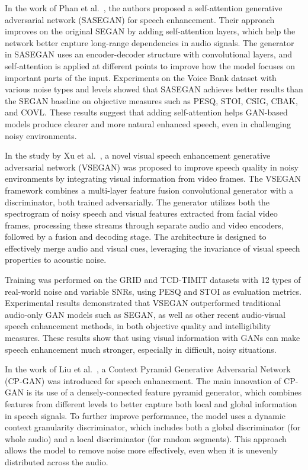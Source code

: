 \vspace{1em}

In the work of Phan et al.~\cite{phan2021selfattention}, the authors proposed a self-attention generative adversarial network (SASEGAN) for speech enhancement. Their approach improves on the original SEGAN by adding self-attention layers, which help the network better capture long-range dependencies in audio signals. The generator in SASEGAN uses an encoder-decoder structure with convolutional layers, and self-attention is applied at different points to improve how the model focuses on important parts of the input. Experiments on the Voice Bank dataset with various noise types and levels showed that SASEGAN achieves better results than the SEGAN baseline on objective measures such as PESQ, STOI, CSIG, CBAK, and COVL. These results suggest that adding self-attention helps GAN-based models produce clearer and more natural enhanced speech, even in challenging noisy environments.


\vspace{1em}

In the study by Xu et al.~\cite{xu2022vsegan}, a novel visual speech enhancement generative adversarial network (VSEGAN) was proposed to improve speech quality in noisy environments by integrating visual information from video frames. The VSEGAN framework combines a multi-layer feature fusion convolutional generator with a discriminator, both trained adversarially. The generator utilizes both the spectrogram of noisy speech and visual features extracted from facial video frames, processing these streams through separate audio and video encoders, followed by a fusion and decoding stage. The architecture is designed to effectively merge audio and visual cues, leveraging the invariance of visual speech properties to acoustic noise.

Training was performed on the GRID and TCD-TIMIT datasets with 12 types of real-world noise and variable SNRs, using PESQ and STOI as evaluation metrics. Experimental results demonstrated that VSEGAN outperformed traditional audio-only GAN models such as SEGAN, as well as other recent audio-visual speech enhancement methods, in both objective quality and intelligibility measures. These results show that using visual information with GANs can make speech enhancement much stronger, especially in difficult, noisy situations.

\vspace{1em}

In the work of Liu et al.~\cite{liu2020cpgan}, a Context Pyramid Generative Adversarial Network (CP-GAN) was introduced for speech enhancement. The main innovation of CP-GAN is its use of a densely-connected feature pyramid generator, which combines features from different levels to better capture both local and global information in speech signals. To further improve performance, the model uses a dynamic context granularity discriminator, which includes both a global discriminator (for whole audio) and a local discriminator (for random segments). This approach allows the model to remove noise more effectively, even when it is unevenly distributed across the audio.

